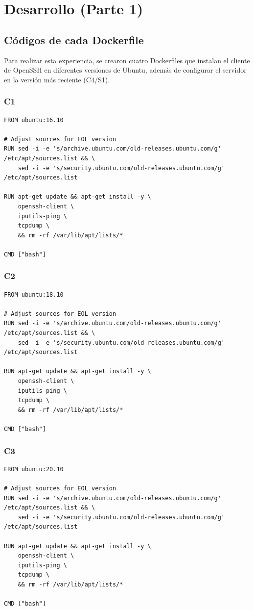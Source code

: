 \documentclass[letter,12pt]{article}
\begin{document}
\section{Desarrollo (Parte 1)}

\subsection{Códigos de cada Dockerfile}
Para realizar esta experiencia, se crearon cuatro Dockerfiles que instalan el cliente de OpenSSH en diferentes versiones de Ubuntu, además de configurar el servidor en la versión más reciente (C4/S1).

\subsubsection{C1}
\begin{lstlisting}
FROM ubuntu:16.10

# Adjust sources for EOL version
RUN sed -i -e 's/archive.ubuntu.com/old-releases.ubuntu.com/g' /etc/apt/sources.list && \
    sed -i -e 's/security.ubuntu.com/old-releases.ubuntu.com/g' /etc/apt/sources.list

RUN apt-get update && apt-get install -y \
    openssh-client \
    iputils-ping \
    tcpdump \
    && rm -rf /var/lib/apt/lists/*

CMD ["bash"]
\end{lstlisting}

\subsubsection{C2}
\begin{lstlisting}
FROM ubuntu:18.10

# Adjust sources for EOL version
RUN sed -i -e 's/archive.ubuntu.com/old-releases.ubuntu.com/g' /etc/apt/sources.list && \
    sed -i -e 's/security.ubuntu.com/old-releases.ubuntu.com/g' /etc/apt/sources.list

RUN apt-get update && apt-get install -y \
    openssh-client \
    iputils-ping \
    tcpdump \
    && rm -rf /var/lib/apt/lists/*

CMD ["bash"]
\end{lstlisting}

\subsubsection{C3}
\begin{lstlisting}
FROM ubuntu:20.10

# Adjust sources for EOL version
RUN sed -i -e 's/archive.ubuntu.com/old-releases.ubuntu.com/g' /etc/apt/sources.list && \
    sed -i -e 's/security.ubuntu.com/old-releases.ubuntu.com/g' /etc/apt/sources.list

RUN apt-get update && apt-get install -y \
    openssh-client \
    iputils-ping \
    tcpdump \
    && rm -rf /var/lib/apt/lists/*

CMD ["bash"]
\end{lstlisting}
\end{document}
